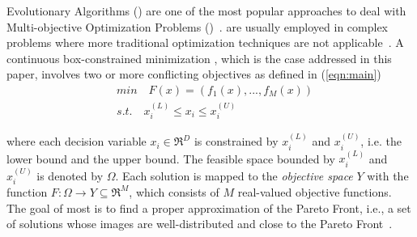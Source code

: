  Evolutionary Algorithms (\MOEAS{}) are one of the most popular approaches 
to deal with Multi-objective Optimization Problems (\MOPS{})~\cite{das2011real, zhou2011multiobjective}.
%
\MOEAS{} are usually employed in complex problems where more traditional optimization techniques are not 
applicable~\cite{Lootsma:99}.
%
A continuous box-constrained minimization \MOP{}, which is the case addressed in this paper,
involves two or more conflicting objectives as defined in (\ref{eqn:main})
%
\begin{equation}\label{eqn:main}
\begin{split}
&min \quad F(x) = (f_1(x), ..., f_M(x)) \\
&s.t. \quad x_i^{(L)} \leq x_i \leq x_i^{(U)}
\end{split}
\end{equation}

where 
each decision variable $x_i \in \Re^D$ is constrained by $x_i^{(L)}$ and $x_i^{(U)}$, 
i.e. the lower bound and the upper bound.
The feasible space bounded by $x_i^{(L)}$ and $x_i^{(U)}$ is denoted by $\Omega$.
Each solution is mapped to the \textit{objective space} $Y$ with the function $F: \Omega \rightarrow Y \subseteq \Re^M$, 
which consists of $M$ real-valued objective functions.
%
%
%
%
%
%
The goal of most \MOEAS{} is to find a proper approximation of the Pareto Front, i.e., a set of
solutions whose images are well-distributed and close to the Pareto Front~\cite{trivedi2016survey}.
%

